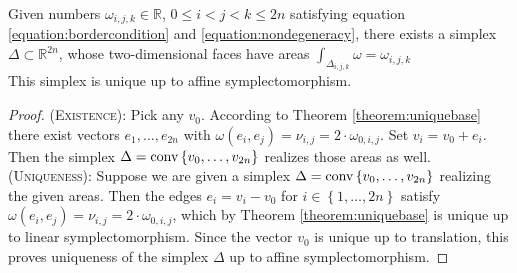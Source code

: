 \documentclass[../SymplecticSimplices.tex]{subfiles}
\begin{document}
\begin{theorem}
  \label{theorem:uniquesimplex}
  Given numbers \( \omega_{i,j,k} \in \mathbb{R} \), \( 0 \leq i < j < k \leq 2n \) satisfying equation \eqref{equation:bordercondition} and \eqref{equation:nondegeneracy}, there exists a simplex \( \Delta \subset \mathbb{R}^{2n} \), whose two-dimensional faces have areas \( \int_{\Delta_{i,j,k}} \omega = \omega_{i,j,k} \)\\
  This simplex is unique up to affine symplectomorphism.
\end{theorem}

\begin{proof}
  (\textsc{Existence}): Pick any \( v_0 \). According to Theorem \ref{theorem:uniquebase} there exist vectors \( e_1, \dots,  e_{2n} \) with \( \omega \left( e_i, e_j \right) = \nu_{i,j} = 2 \cdot \omega_{0,i,j} \). Set \( v_i = v_0 + e_i \). Then the simplex \( \Delta = \textnormal{conv} \left\lbrace v_0, \dots, v_{2n} \right\rbrace \) realizes those areas as well.\\

  (\textsc{Uniqueness}): Suppose we are given a simplex \( \Delta = \textnormal{conv} \left\lbrace v_0, \dots, v_{2n} \right\rbrace \) realizing the given areas. Then the edges \( e_i = v_i - v_0 \) for \( i \in \left\lbrace 1, \dots, 2n \right\rbrace \) satisfy \( \omega \left( e_i, e_j \right) = \nu_{i,j} = 2 \cdot \omega_{0,i,j} \), which by Theorem \ref{theorem:uniquebase} is unique up to linear symplectomorphism. Since the vector \( v_0 \) is unique up to translation, this proves uniqueness of the simplex \( \Delta \) up to affine symplectomorphism.
\end{proof}
\end{document}
